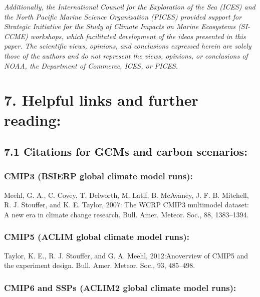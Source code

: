 \documentclass[
]{article}
\begin{document}
\emph{Additionally, the International Council for the Exploration of the
Sea (ICES) and the North Pacific Marine Science Organization (PICES)
provided support for Strategic Initiative for the Study of Climate
Impacts on Marine Ecosystems (SI-CCME) workshops, which facilitated
development of the ideas presented in this paper. The scientific views,
opinions, and conclusions expressed herein are solely those of the
authors and do not represent the views, opinions, or conclusions of
NOAA, the Department of Commerce, ICES, or PICES.}

\hypertarget{helpful-links-and-further-reading}{%
\section{7. Helpful links and further
reading:}\label{helpful-links-and-further-reading}}

\hypertarget{citations-for-gcms-and-carbon-scenarios}{%
\subsection{7.1 Citations for GCMs and carbon
scenarios:}\label{citations-for-gcms-and-carbon-scenarios}}

\hypertarget{cmip3-bsierp-global-climate-model-runs}{%
\subsubsection{CMIP3 (BSIERP global climate model
runs):}\label{cmip3-bsierp-global-climate-model-runs}}

Meehl, G. A., C. Covey, T. Delworth, M. Latif, B. McAvaney, J. F. B.
Mitchell, R. J. Stouffer, and K. E. Taylor, 2007: The WCRP CMIP3
multimodel dataset: A new era in climate change research. Bull. Amer.
Meteor. Soc., 88, 1383--1394.

\hypertarget{cmip5-aclim-global-climate-model-runs}{%
\subsubsection{CMIP5 (ACLIM global climate model
runs):}\label{cmip5-aclim-global-climate-model-runs}}

Taylor, K. E., R. J. Stouffer, and G. A. Meehl, 2012:Anoverview of CMIP5
and the experiment design. Bull. Amer. Meteor. Soc., 93, 485--498.

\hypertarget{cmip6-and-ssps-aclim2-global-climate-model-runs}{%
\subsubsection{CMIP6 and SSPs (ACLIM2 global climate model
runs):}\label{cmip6-and-ssps-aclim2-global-climate-model-runs}}
\end{document}
